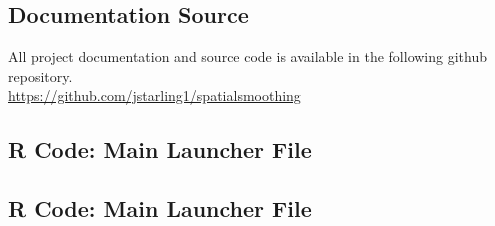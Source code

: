 \documentclass[11pt]{article}
\newcommand{\myindent}{\hspace*{1cm}}
\begin{document}
\subsection{Documentation Source}
All project documentation and source code is available in the following github repository. \\

\myindent \underline{https://github.com/jstarling1/spatialsmoothing}

\subsection{R Code: Main Launcher File}


\subsection{R Code: Main Launcher File}


% 
% 
% 
% 
% 
\end{document}
